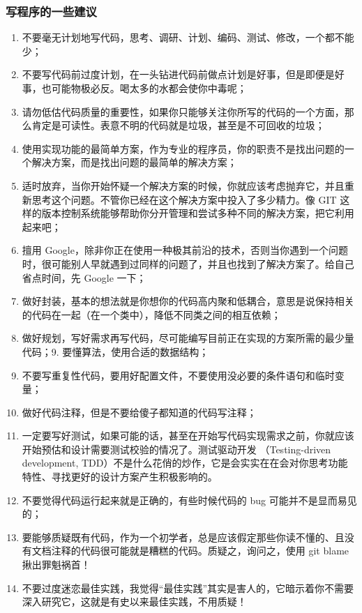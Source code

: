 \subsubsection{写程序的一些建议}
\begin{enumerate}
    \item 不要毫无计划地写代码，思考、调研、计划、编码、测试、修改，一个都不能少；
    \item 不要写代码前过度计划，在一头钻进代码前做点计划是好事，但是即便是好事，也可能物极必反。喝太多的水都会使你中毒呢；
    \item 请勿低估代码质量的重要性，如果你只能够关注你所写的代码的一个方面，那么肯定是可读性。表意不明的代码就是垃圾，甚至是不可回收的垃圾；
    \item 使用实现功能的最简单方案，作为专业的程序员，你的职责不是找出问题的一个解决方案，而是找出问题的最简单的解决方案；
    \item 适时放弃，当你开始怀疑一个解决方案的时候，你就应该考虑抛弃它，并且重新思考这个问题。不管你已经在这个解决方案中投入了多少精力。像 GIT 这样的版本控制系统能够帮助你分开管理和尝试多种不同的解决方案，把它利用起来吧；
    \item 擅用 Google，除非你正在使用一种极其前沿的技术，否则当你遇到一个问题时，很可能别人早就遇到过同样的问题了，并且也找到了解决方案了。给自己省点时间，先 Google 一下；
    \item 做好封装，基本的想法就是你想你的代码高内聚和低耦合，意思是说保持相关的代码在一起（在一个类中），降低不同类之间的相互依赖；
    \item 做好规划，写好需求再写代码，尽可能编写目前正在实现的方案所需的最少量代码；9. 要懂算法，使用合适的数据结构；
    \item 不要写重复性代码，要用好配置文件，不要使用没必要的条件语句和临时变量；
    \item 做好代码注释，但是不要给傻子都知道的代码写注释；
    \item 一定要写好测试，如果可能的话，甚至在开始写代码实现需求之前，你就应该开始预估和设计需要测试校验的情况了。测试驱动开发 （Testing-driven development, TDD）不是什么花俏的炒作，它是会实实在在会对你思考功能特性、寻找更好的设计方案产生积极影响的。
    \item 不要觉得代码运行起来就是正确的，有些时候代码的 bug 可能并不是显而易见的；
    \item 要能够质疑既有代码，作为一个初学者，总是应该假定那些你读不懂的、且没有文档注释的代码很可能就是糟糕的代码。质疑之，询问之，使用 git blame 揪出罪魁祸首！
    \item 不要过度迷恋最佳实践，我觉得“最佳实践”其实是害人的，它暗示着你不需要深入研究它，这就是有史以来最佳实践，不用质疑！

\end{enumerate}
